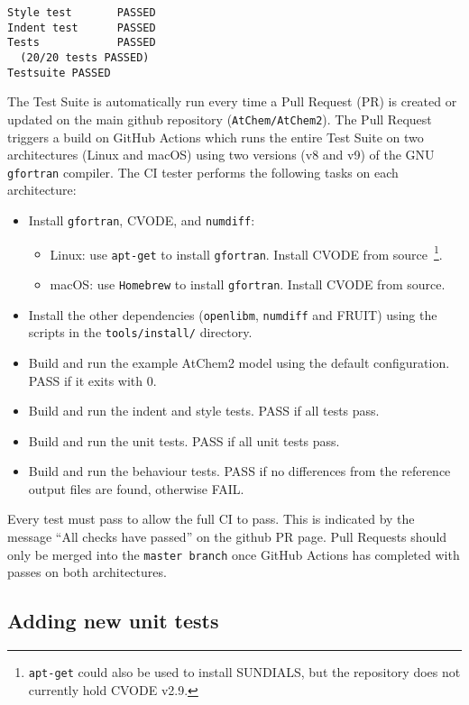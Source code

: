 \begin{verbatim}
Style test       PASSED
Indent test      PASSED
Tests            PASSED
  (20/20 tests PASSED)
Testsuite PASSED
\end{verbatim}

The Test Suite is automatically run every time a Pull Request (PR) is created
or updated on the main github repository (\texttt{AtChem/AtChem2}).  The Pull
Request triggers a build on GitHub Actions which runs the entire Test Suite on
two architectures (Linux and macOS) using two versions (v8 and v9) of the GNU
\texttt{gfortran} compiler. The CI tester performs the following tasks on each
architecture:

\begin{itemize}
\item Install \texttt{gfortran}, CVODE, and \texttt{numdiff}:
  \begin{itemize}
  \item Linux: use \texttt{apt-get} to install \texttt{gfortran}. Install
    CVODE from source~\footnote{\texttt{apt-get} could also be used to install
      SUNDIALS, but the repository does not currently hold CVODE v2.9.}.
  \item macOS: use \texttt{Homebrew} to install \texttt{gfortran}. Install
    CVODE from source.
  \end{itemize}
\item Install the other dependencies (\texttt{openlibm}, \texttt{numdiff} and
  FRUIT) using the scripts in the \texttt{tools/install/} directory.
\item Build and run the example AtChem2 model using the default
  configuration. PASS if it exits with 0.
\item Build and run the indent and style tests. PASS if all tests pass.
\item Build and run the unit tests. PASS if all unit tests pass.
\item Build and run the behaviour tests. PASS if no differences from
  the reference output files are found, otherwise FAIL.
\end{itemize}

Every test must pass to allow the full CI to pass. This is indicated
by the message ``All checks have passed'' on the github PR page. Pull
Requests should only be merged into the \texttt{master\ branch} once
GitHub Actions has completed with passes on both architectures.

\subsection{Adding new unit tests} \label{subsec:adding-new-unit-tests}

